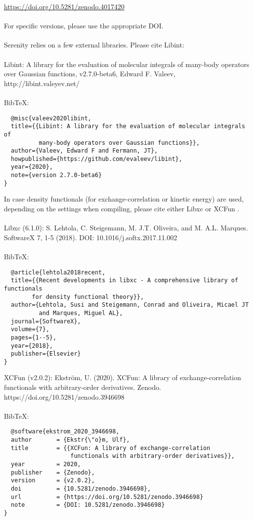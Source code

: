 \documentclass[bibliography=totocnumbered,a4paper,10pt,oneside]{scrbook}
\begin{document}
\url{https://doi.org/10.5281/zenodo.4017420}\\
\\
For specific versions, please use the appropriate DOI.\\
\\
Serenity relies on a few external libraries. Please cite Libint: \cite{Libint2.7.0}\\
\\
Libint: A library for the evaluation of molecular integrals of many-body operators  over Gaussian functions, v2.7.0-beta6, Edward F. Valeev, http://libint.valeyev.net/ \\
\\
BibTeX:
\begin{lstlisting}
  @misc{valeev2020libint,
  title={{Libint: A library for the evaluation of molecular integrals of 
          many-body operators over Gaussian functions}},
  author={Valeev, Edward F and Fermann, JT},
  howpublished={https://github.com/evaleev/libint},
  year={2020},
  note={version 2.7.0-beta6}
}
\end{lstlisting}
In case density functionals (for exchange-correlation or kinetic energy) are used, depending on the settings when compiling, please cite either Libxc \cite{Libxc} or XCFun \cite{XCFun2.0.2}.\\
\\
Libxc (6.1.0): S. Lehtola, C. Steigemann, M. J.T. Oliveira, and M. A.L. Marques. SoftwareX 7, 1-5 (2018). DOI: 10.1016/j.softx.2017.11.002\\
\\
BibTeX:
\begin{lstlisting}
  @article{lehtola2018recent,
  title={{Recent developments in libxc - A comprehensive library of functionals
        for density functional theory}},
  author={Lehtola, Susi and Steigemann, Conrad and Oliveira, Micael JT
          and Marques, Miguel AL},
  journal={SoftwareX},
  volume={7},
  pages={1--5},
  year={2018},
  publisher={Elsevier}
}
\end{lstlisting}
XCFun (v2.0.2):  Ekström, U. (2020). XCFun: A library of exchange-correlation functionals with  arbitrary-order derivatives. Zenodo. https://doi.org/10.5281/zenodo.3946698  \\
\\
BibTeX:
\begin{lstlisting}
  @software{ekstrom_2020_3946698,
  author       = {Ekstr{\"o}m, Ulf},
  title        = {{XCFun: A library of exchange-correlation 
                   functionals with arbitrary-order derivatives}},
  year         = 2020,
  publisher    = {Zenodo},
  version      = {v2.0.2},
  doi          = {10.5281/zenodo.3946698},
  url          = {https://doi.org/10.5281/zenodo.3946698}
  note         = {DOI: 10.5281/zenodo.3946698}
}
\end{lstlisting}
\end{document}
